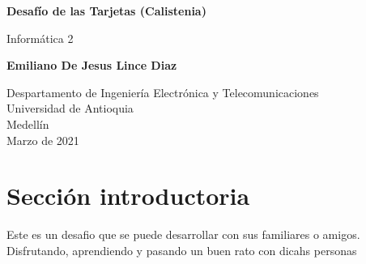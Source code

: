 \documentclass{article}
\begin{document}
\begin{titlepage}
    \begin{center}
        \vspace*{1cm}
            
        \Huge
        \textbf{Desafío de las Tarjetas (Calistenia)}
            
        \vspace{0.5cm}
        \LARGE
        Informática 2
            
        \vspace{1.5cm}
            
        \textbf{Emiliano De Jesus Lince Diaz}
            
        \vfill
            
        \vspace{0.8cm}
            
        \Large
        Despartamento de Ingeniería Electrónica y Telecomunicaciones\\
        Universidad de Antioquia\\
        Medellín\\
        Marzo de 2021
            
    \end{center}
\end{titlepage}

\tableofcontents
\newpage
\section{Sección introductoria}\label{intro}
Este es un desafio que se puede desarrollar con sus familiares o amigos. Disfrutando, aprendiendo y pasando un buen rato con dicahs personas
\end{document}
